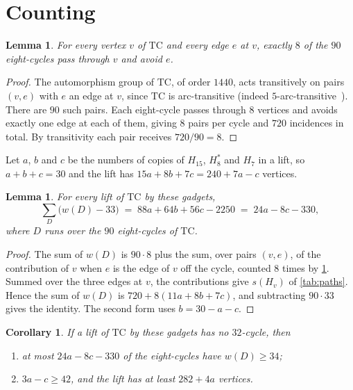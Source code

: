 \documentclass[11pt]{amsart}
\newtheorem{lemma}[theorem]{Lemma}
\newtheorem{corollary}[theorem]{Corollary}
\theoremstyle{remark}
\newcommand{\Hseven}{H_7}
\newcommand{\Hfifteen}{H_{15}}
\newcommand{\Height}{H_8^{*}}
\newcommand{\TC}{\mathrm{TC}}
\begin{document}
\section{Counting}\label{sec:counting}

\begin{lemma}\label{lem:incidence}
For every vertex $v$ of $\TC$ and every edge $e$ at $v$, exactly $8$ of the
$90$ eight-cycles pass through $v$ and avoid $e$.
\end{lemma}

\begin{proof}
The automorphism group of $\TC$, of order $1440$, acts transitively on pairs
$(v,e)$ with $e$ an edge at $v$, since $\TC$ is arc-transitive (indeed
$5$-arc-transitive~\cite{Tutte1947}). There are $90$ such pairs. Each
eight-cycle passes through $8$ vertices and avoids exactly one edge at each of
them, giving $8$ pairs per cycle and $720$ incidences in total. By
transitivity each pair receives $720/90=8$.
\end{proof}

Let $a$, $b$ and $c$ be the numbers of copies of $\Hfifteen$, $\Height$ and
$\Hseven$ in a lift, so $a+b+c=30$ and the lift has $15a+8b+7c=240+7a-c$
vertices.

\begin{lemma}\label{lem:identity}
For every lift of $\TC$ by these gadgets,
\[
  \sum_{D}\bigl(w(D)-33\bigr) \;=\; 88a+64b+56c-2250 \;=\; 24a-8c-330,
\]
where $D$ runs over the $90$ eight-cycles of $\TC$.
\end{lemma}

\begin{proof}
The sum of $w(D)$ is $90\cdot 8$ plus the sum, over pairs $(v,e)$, of the
contribution of $v$ when $e$ is the edge of $v$ off the cycle, counted $8$
times by \cref{lem:incidence}. Summed over the three edges at $v$, the
contributions give $s(H_v)$ of \cref{tab:paths}. Hence the sum of $w(D)$ is
$720+8(11a+8b+7c)$, and subtracting $90\cdot 33$ gives the identity. The second
form uses $b=30-a-c$.
\end{proof}

\begin{corollary}\label{cor:counting}
If a lift of $\TC$ by these gadgets has no $32$-cycle, then
\begin{enumerate}[label=\textup{(\alph*)}]
\item at most $24a-8c-330$ of the eight-cycles have $w(D)\ge 34$;
\item $3a-c\ge 42$, and the lift has at least $282+4a$ vertices.
\end{enumerate}
\end{corollary}
\end{document}
